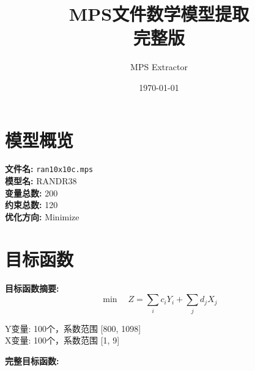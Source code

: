 \documentclass[a4paper,10pt]{article}
\title{MPS文件数学模型提取\\{\large 完整版}}
\author{MPS Extractor}
\date{\today}
\begin{document}
\maketitle
\tableofcontents
\newpage

\section{模型概览}

\textbf{文件名:} \texttt{ran10x10c.mps} \\
\textbf{模型名:} RANDR38 \\
\textbf{变量总数:} 200 \\
\textbf{约束总数:} 120 \\
\textbf{优化方向:} Minimize \\

\section{目标函数}

\textbf{目标函数摘要:}
\begin{equation}
\min \quad Z = \sum_{i} c_i Y_i + \sum_{j} d_j X_j
\end{equation}

Y变量: 100个，系数范围 [800, 1098] \\
X变量: 100个，系数范围 [1, 9]

\textbf{完整目标函数:}
\end{document}
